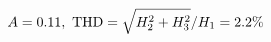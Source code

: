 \documentclass[preview]{standalone}
\begin{document}
\begin{align*}
\special{dvisvgm:raw <g id='unique000'>}A=0.11,\ \text{THD}=\sqrt{H_2^2+H_3^2}/H_1=2.2\%\special{dvisvgm:raw </g>}
\end{align*}
\end{document}
